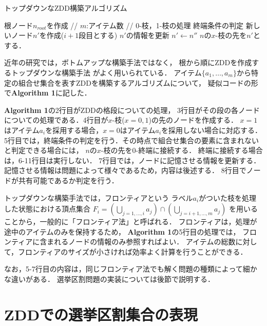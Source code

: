 \begin{algorithm}
  \caption{トップダウンなZDD構築アルゴリズム}
  \label{zdd_topdown}
  \begin{algorithmic}[1]
    \State 根ノード$n_{root}$を作成
     // $m$:アイテム数
       // 0-枝，1-枝の処理
        \State 終端条件の判定
        \State 新しいノード$n'$を作成($i+1$段目とする)
        \State $n'$の情報を更新
          \State $n' \gets n''$
        \EndIf
        \State $n$の$x$-枝の先を$n'$とする．
        \EndFor
      \EndFor
    \EndFor
  \end{algorithmic}
\end{algorithm}

近年の研究では，ボトムアップな構築手法ではなく，
根から順にZDDを作成するトップダウンな構築手法\cite{minato_or}\cite{sekine}
がよく用いられている．
アイテム$\{a_1,\ldots	,a_m\}$から特定の組合せ集合を表すZDDを構築するアルゴリズムについて，
疑似コードの形で\textbf{Algorithm 1}に記した．

\textbf{Algorithm 1}の2行目がZDDの格段についての処理，
3行目がその段の各ノードについての処理である．4行目が$x$-枝($x=0,1$)の先のノードを作成する．
$x=1$はアイテム$a_i$を採用する場合，$x=0$はアイテム$a_i$を採用しない場合に対応する．
5行目では，終端条件の判定を行う．その時点で組合せ集合の要素に含まれないと判定できる場合には，
$n$の$x$-枝の先を0-終端に接続する．
終端に接続する場合は，6-11行目は実行しない．
7行目では，ノードに記憶させる情報を更新する．
記憶させる情報は問題によって様々であるため，内容は後述する．
8行目でノードが共有可能であるか判定を行う．

トップダウンな構築手法では，フロンティアという
ラベル$a_i$がついた枝を処理した状態における頂点集合
$F_i=(\bigcup_{j=1,\ldots ,i}a_j)\cap (\bigcup_{j=i+1, \ldots, m} a_j)$
を用いることから，一般的に「フロンティア法」と呼ばれる．
フロンティアは，処理が途中のアイテムのみを保持するため，
\textbf{Algorithm 1}の5行目の処理では，
フロンティアに含まれるノードの情報のみ参照すればよい．
アイテムの総数に対して，フロンティアのサイズが小さければ効率よく計算を行うことができる．

なお，5-7行目の内容は，同じフロンティア法でも解く問題の種類によって細かな違いがある．
選挙区割問題の実装については後節で説明する．

\section{ZDDでの選挙区割集合の表現}


